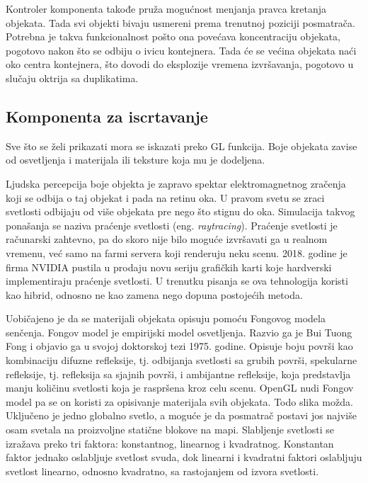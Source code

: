 \documentclass[12pt,oneside]{memoir}
\begin{document}
Kontroler komponenta takođe pruža mogućnost menjanja pravca kretanja objekata. 
Tada svi objekti bivaju usmereni prema trenutnoj poziciji posmatrača. 
Potrebna je takva funkcionalnost pošto ona povećava koncentraciju objekata, 
pogotovo nakon što se odbiju o ivicu kontejnera. Tada će se većina objekata 
naći oko centra kontejnera, što dovodi do eksplozije vremena izvršavanja, pogotovo u slučaju oktrija sa duplikatima.

\subsection{Komponenta za iscrtavanje}

Sve što se želi prikazati mora se iskazati preko GL funkcija. 
Boje objekata zavise od osvetljenja i materijala ili teksture koja mu je dodeljena.

Ljudska percepcija boje objekta je zapravo spektar elektromagnetnog zračenja koji se odbija o taj objekat i pada na retinu oka.
U pravom svetu se zraci svetlosti odbijaju od više objekata pre nego što stignu do oka. 
Simulacija takvog ponašanja se naziva praćenje svetlosti (eng. {\em raytracing}).  
Praćenje svetlosti je računarski zahtevno, pa do skoro nije bilo moguće izvršavati ga u realnom vremenu, već samo na farmi servera koji renderuju neku scenu.
2018. godine je firma NVIDIA pustila u prodaju novu seriju grafičkih karti koje hardverski implementiraju praćenje svetlosti. 
U trenutku pisanja se ova tehnologija koristi kao hibrid, odnosno ne kao zamena nego dopuna postojećih metoda.

Uobičajeno je da se materijali objekata opisuju pomoću Fongovog modela senčenja. 
Fongov model je empirijski model osvetljenja. Razvio ga je Bui Tuong Fong i objavio ga u svojoj doktorskoj tezi 1975. godine.
Opisuje boju površi kao kombinaciju difuzne refleksije, tj. odbijanja svetlosti sa grubih površi, 
spekularne refleksije, tj. refleksija sa sjajnih površi, i ambijantne refleksije, koja predstavlja manju količinu svetlosti 
koja je raspršena kroz celu scenu.
\cite{Phong} OpenGL nudi Fongov model pa se on koristi za opisivanje materijala svih objekata.
Todo slika možda.
Uključeno je jedno globalno svetlo, a moguće je da posmatrač postavi jos najviše osam svetala na 
proizvoljne statične blokove na mapi. 
Slabljenje svetlosti se izražava preko tri faktora: konstantnog, linearnog i kvadratnog.
Konstantan faktor jednako oslabljuje svetlost svuda, dok linearni i kvadratni faktori oslabljuju svetlost
linearno, odnosno kvadratno, sa rastojanjem od izvora svetlosti.
\end{document}
